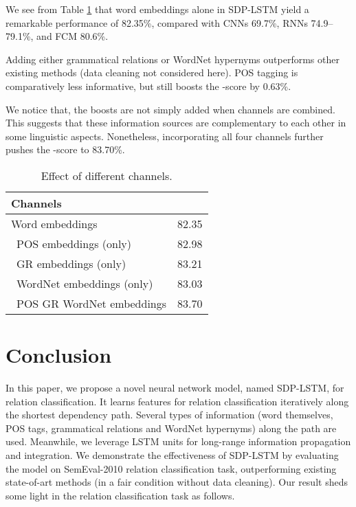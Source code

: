 \documentclass[11pt,a4paper]{article}
\begin{document}
We see from Table \ref{tChannel} that word embeddings alone in SDP-LSTM
yield a remarkable performance of 82.35\%,
compared with CNNs 69.7\%, RNNs 74.9--79.1\%, and FCM 80.6\%.

Adding either grammatical relations or WordNet hypernyms
outperforms other existing methods (data cleaning not considered here).
POS tagging is comparatively less informative, but
still boosts the -score by 0.63\%.

We notice that, the boosts are not simply added
when channels are combined. This suggests that these
information sources are complementary to each other in some linguistic aspects.
Nonetheless, incorporating all four channels further
pushes the -score to 83.70\%.


\begin{table}[!t]
\centering
\vspace{-.2cm}
\begin{tabular}{lc}
\hline
\hline
\textbf{Channels}  &  \\
\hline
Word embeddings     & 82.35  \\
\  POS embeddings (only)   & 82.98  \\
\  GR embeddings  (only)   & 83.21   \\
\  WordNet embeddings (only)    & 83.03\\
\  POS  GR  WordNet embeddings & 83.70\\
\hline
\hline
\end{tabular}
\caption{Effect of different channels.}\label{tChannel}
\vspace{-.3cm}
\end{table}

\section{Conclusion}\label{sConclusion}
In this paper, we propose a novel neural network model, named SDP-LSTM, for relation classification.
It learns features for relation classification iteratively along the shortest dependency path.
Several types of information (word themselves, POS tags, grammatical relations and WordNet hypernyms) along the path are used.
Meanwhile, we leverage LSTM units for long-range information propagation and integration.
We demonstrate the effectiveness of SDP-LSTM by evaluating the model on SemEval-2010 relation classification task, outperforming 
existing state-of-art methods (in a fair condition without data cleaning).
Our result sheds some light in the relation classification task as follows.
\end{document}
